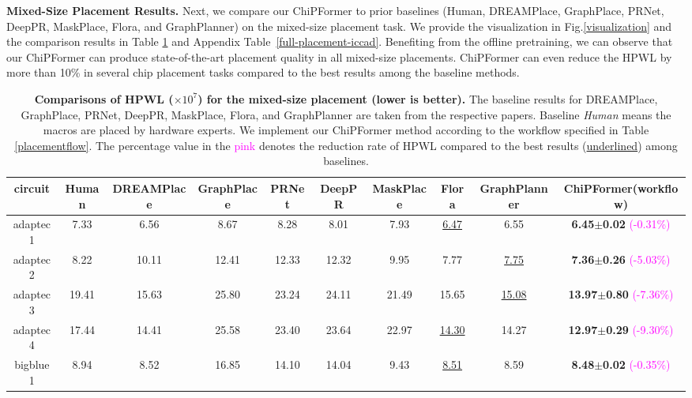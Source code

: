 \documentclass{article}
\theoremstyle{plain}
\theoremstyle{definition}
\theoremstyle{remark}
\begin{document}
\textbf{Mixed-Size Placement Results.} 
Next, we compare our ChiPFormer to prior baselines (Human, DREAMPlace, GraphPlace, PRNet, DeepPR, MaskPlace, Flora, and GraphPlanner) on the mixed-size placement task. We provide the visualization in Fig.\ref{visualization} and the comparison results in Table \ref{full-placement} and Appendix Table~\ref{full-placement-iccad}. 
Benefiting from the offline pretraining, 
we can observe that our ChiPFormer can produce state-of-the-art placement quality in all mixed-size placements. ChiPFormer can even reduce the HPWL by more than 10\% in several chip placement tasks compared to the best results among the baseline methods. 


\begin{table}[!htb]
\caption{
\textbf{Comparisons of HPWL ($\times$$10^7$) for the mixed-size placement (lower is better).} The baseline results for DREAMPlace, GraphPlace, PRNet, DeepPR, MaskPlace, Flora, and GraphPlanner are taken from the respective papers. Baseline \textit{Human} means the macros are placed by hardware experts. We implement our ChiPFormer method according to the workflow specified in Table \ref{placementflow}. The percentage value in the \textcolor{magenta}{pink} denotes the reduction rate of HPWL compared to the best results (\underline{underlined}) among baselines.
}
\label{full-placement}
\begin{center}
\begin{adjustbox}{max width=2\columnwidth}
\begin{tabular}{ccccccccc|c}
\toprule circuit & Human & DREAMPlace & GraphPlace & PRNet & DeepPR & MaskPlace & Flora & GraphPlanner & ChiPFormer(workflow) \\
\midrule 
adaptec1   & 7.33 & 6.56 & 8.67 & 8.28 & 8.01 & 7.93 & \underline{6.47} & 6.55 & \textbf{6.45$\pm$0.02} \textcolor{magenta}{\scriptsize{(-0.31\%)}} \\
adaptec2   & 8.22 & 10.11 & 12.41 & 12.33 & 12.32 & 9.95 & 7.77 & \underline{7.75} & \textbf{7.36$\pm$0.26} \textcolor{magenta}{\scriptsize{(-5.03\%)}} \\
adaptec3   & 19.41 & 15.63 & 25.80 & 23.24 & 24.11 & 21.49 & 15.65 & \underline{15.08} & \textbf{13.97$\pm$0.80} \textcolor{magenta}{\scriptsize{(-7.36\%)}}\\
adaptec4   & 17.44 & 14.41 & 25.58 & 23.40 & 23.64 & 22.97 & \underline{14.30} & 14.27 & \textbf{12.97$\pm$0.29} \textcolor{magenta}{\scriptsize{(-9.30\%)}}\\
bigblue1   & 8.94 & 8.52 & 16.85 & 14.10 & 14.04 & 9.43 &  \underline{8.51} & 8.59 & \textbf{8.48$\pm$0.02} \textcolor{magenta}{\scriptsize{(-0.35\%)}}\\

\end{tabular}
\end{adjustbox}
\end{center}
\end{table}
\end{document}
